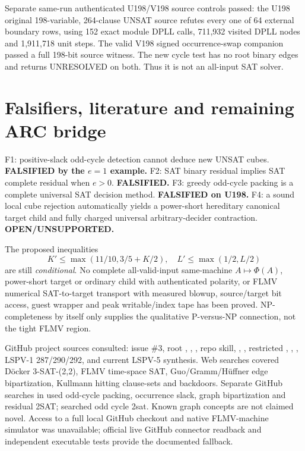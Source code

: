 \documentclass[11pt]{article}
\begin{document}
Separate same-run authenticated U198/V198 source controls passed: the U198 original 198-variable, 264-clause UNSAT source refutes every one of 64 external boundary rows, using 152 exact module DPLL calls, 711,932 visited DPLL nodes and 1,911,718 unit steps. The valid V198 signed occurrence-swap companion passed a full 198-bit source witness. The new cycle test has no root binary edges and returns UNRESOLVED on both. Thus it is not an all-input SAT solver.

\section{Falsifiers, literature and remaining ARC bridge}
F1: positive-slack odd-cycle detection cannot deduce new UNSAT cubes. \textbf{FALSIFIED by the $e=1$ example.} F2: SAT binary residual implies SAT complete residual when $e>0$. \textbf{FALSIFIED.} F3: greedy odd-cycle packing is a complete universal SAT decision method. \textbf{FALSIFIED on U198.} F4: a sound local cube rejection automatically yields a power-short hereditary canonical target child and fully charged universal arbitrary-decider contraction. \textbf{OPEN/UNSUPPORTED.}

The proposed inequalities
\[
K'\le\max(11/10,3/5+K/2),\quad L'\le\max(1/2,L/2)
\]
are still \emph{conditional}. No complete all-valid-input same-machine $A\mapsto\Phi(A)$, power-short target or ordinary child with authenticated polarity, or FLMV numerical SAT-to-target transport with measured blowup, source/target bit access, guest wrapper and peak writable/index tape has been proved. NP-completeness by itself only supplies the qualitative P-versus-NP connection, not the tight FLMV region.

GitHub project sources consulted: issue \#3, root , , , repo  skill, , , restricted , , , LSPV-1 287/290/292, and current LSPV-5 synthesis. Web searches covered D\"ocker 3-SAT-(2,2), FLMV time-space SAT, Guo/Gramm/H\"uffner edge bipartization, Kullmann hitting clause-sets and backdoors. Separate GitHub searches in  used odd-cycle packing, occurrence slack, graph bipartization and residual 2SAT;  searched odd cycle 2sat. Known graph concepts are not claimed novel. Access to a full local GitHub checkout and native FLMV-machine simulator was unavailable; official live GitHub connector readback and independent executable tests provide the documented fallback.
\end{document}

